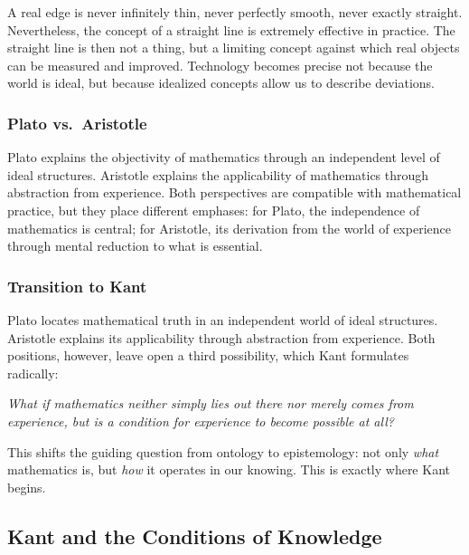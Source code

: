 A real edge is never infinitely thin,
never perfectly smooth,
never exactly straight.
Nevertheless, the concept of a straight line is extremely effective in practice.
The straight line is then not a thing,
but a limiting concept
against which real objects can be measured and improved.
Technology becomes precise not because the world is ideal,
but because idealized concepts allow us to describe deviations.

\subsubsection*{Plato vs.\ Aristotle}

Plato explains the objectivity of mathematics
through an independent level of ideal structures.
Aristotle explains the applicability of mathematics
through abstraction from experience.
Both perspectives are compatible with mathematical practice,
but they place different emphases:
for Plato, the independence of mathematics is central;
for Aristotle, its derivation from the world of experience
through mental reduction to what is essential.

\subsubsection*{Transition to Kant}

Plato locates mathematical truth
in an independent world of ideal structures.
Aristotle explains its applicability
through abstraction from experience.
Both positions, however, leave open a third possibility,
which Kant formulates radically:

\medskip
\noindent
\emph{What if mathematics neither simply lies out there
	nor merely comes from experience,
	but is a condition for experience to become possible at all?}

\medskip

This shifts the guiding question from ontology to epistemology:
not only \emph{what} mathematics is,
but \emph{how} it operates in our knowing.
This is exactly where Kant begins.


\subsection{Kant and the Conditions of Knowledge}
\label{sec:8.3}

